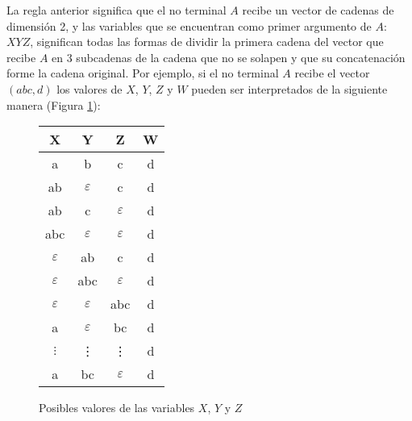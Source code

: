 




La regla anterior significa que el no terminal $A$ recibe un vector de cadenas de dimensión 2, y las variables que se encuentran como primer argumento
de $A$: $XYZ$, significan todas las formas de dividir la primera cadena del vector que recibe $A$ en 3 subcadenas de la cadena que no se solapen
y que su concatenación forme la cadena original. Por ejemplo, si el no terminal $A$ recibe el vector $(abc,d)$ los valores de $X$, $Y$, $Z$ y $W$
pueden ser interpretados de la siguiente manera (Figura \ref{fig:xyz_eaxmple}):

\begin{figure}
    \centering
    \begin{tabular}{|c|c|c|c|}
        \hline
        X             & Y             & Z             & W \\
        \hline
        a             & b             & c             & d \\
        \hline
        ab            & $\varepsilon$ & c             & d \\
        \hline
        ab            & c             & $\varepsilon$ & d \\
        \hline
        abc           & $\varepsilon$ & $\varepsilon$ & d \\
        \hline
        $\varepsilon$ & ab            & c             & d \\
        \hline
        $\varepsilon$ & abc           & $\varepsilon$ & d \\
        \hline
        $\varepsilon$ & $\varepsilon$ & abc           & d \\
        \hline
        a             & $\varepsilon$ & bc            & d \\
        \hline
        $\vdots$      & \vdots        & \vdots        & d \\
        \hline
        a             & bc            & $\varepsilon$ & d \\
        \hline
    \end{tabular}
    \caption{Posibles valores de las variables $X$, $Y$ y $Z$}
    \label{fig:xyz_eaxmple}
\end{figure}

